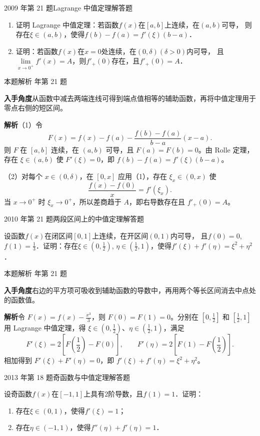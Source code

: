 \documentclass[UTF8,zihao=-4,fontset=fandol]{ctexart}
\renewcommand{\lim}{\operatorname*{lim}\limits}
\newcommand{\QuestionPage}[6]{%
  \par\noindent\begin{minipage}{\linewidth}
  \raggedright
  {\small\textcolor{black!60}{#3\quad #5}\hfill\textcolor{accent}{#2}}\par\smallskip}
\newcommand{\QuestionEnd}{\end{minipage}\par\medskip}
\newcommand{\QuestionPage}[6]{%
  \clearpage
  {\small\textcolor{accent}{#1\hfill #2}}\par\medskip
  {\small\textcolor{black!60}{#3\quad #5\hfill #6}}\par\vspace{9bp}}
\newcommand{\QuestionEnd}{}
\newenvironment{QuestionSolution}[1]{%
  \clearpage
  {\small\textcolor{black!60}{本题解析\quad #1}}\par\medskip
}{\par\clearpage}
\begin{document}
\QuestionPage{2.4 微分中值定理及其应用}{解答题}{2009 年第 21 题}{4}{Lagrange 中值定理}{087 / 234}
\begin{enumerate}
\item 证明 Lagrange 中值定理：若函数$f(x)$在$\left[a,b \right]$上连续，在$(a,b)$可导，
      则存在$\xi \in \left(a,b \right)$，使得$f(b) - f(a) = f'\left(\xi \right)(b - a)$．
\item 证明：若函数$f(x)$在$x = 0$处连续，在$\left(0,\delta \right)\left(\delta > 0 \right)$内可导，
      且$\lim_{x \to 0^+} f'(x) = A$，则$f'_+(0)$存在，且$f'_+(0) = A$．
\end{enumerate}
\QuestionEnd

\begin{QuestionSolution}{2009 年第 21 题}
\textbf{入手角度}\quad 从函数中减去两端连线可得到端点值相等的辅助函数，再将中值定理用于零点右侧的短区间。

\textbf{解析}\quad （1）令
\[
F(x)=f(x)-f(a)-\frac{f(b)-f(a)}{b-a}(x-a).
\]
则 \(F\) 在 \([a,b]\) 连续，在 \((a,b)\) 可导，且 \(F(a)=F(b)=0\)。由 Rolle 定理，存在 \(\xi\in(a,b)\) 使 \(F'(\xi)=0\)，即 \(f(b)-f(a)=f'(\xi)(b-a)\)。

（2）对每个 \(x\in(0,\delta)\)，在 \([0,x]\) 应用（1），存在 \(\xi_x\in(0,x)\) 使
\[
\frac{f(x)-f(0)}x=f'(\xi_x).
\]
当 \(x\to0^+\) 时 \(\xi_x\to0^+\)，所以差商趋于 \(A\)，即右导数存在且 \(f'_+(0)=A\)。
\end{QuestionSolution}

\QuestionPage{2.4 微分中值定理及其应用}{解答题}{2010 年第 21 题}{4}{两段区间上的中值定理}{088 / 234}
设函数$f(x)$在闭区间$[0,1]$上连续，在开区间$(0,1)$内可导，
且$f(0) = 0$, $f(1) = \frac{1}{3}$．证明：存在$\xi \in \left(0,\frac{1}{2}\right)$,
$\eta \in \left(\frac{1}{2},1\right)$，使得$f'(\xi) + f'(\eta) = \xi^2 + \eta^2$．
\QuestionEnd

\begin{QuestionSolution}{2010 年第 21 题}
\textbf{入手角度}\quad 右边的平方项可吸收到辅助函数的导数中，再用两个等长区间消去中点处的函数值。

\textbf{解析}\quad 令 \(F(x)=f(x)-\frac{x^3}{3}\)，则 \(F(0)=F(1)=0\)。分别在 \([0,\frac{1}{2}]\) 和 \([\frac{1}{2},1]\) 用 Lagrange 中值定理，得 \(\xi\in(0,\frac{1}{2})\)、\(\eta\in(\frac{1}{2},1)\)，满足
\[
F'(\xi)=2[F(\frac{1}{2})-F(0)],\qquad
F'(\eta)=2[F(1)-F(\frac{1}{2})].
\]
相加得到 \(F'(\xi)+F'(\eta)=0\)，即 \(f'(\xi)+f'(\eta)=\xi^2+\eta^2\)。
\end{QuestionSolution}

\QuestionPage{2.4 微分中值定理及其应用}{解答题}{2013 年第 18 题}{3}{奇函数与中值定理}{089 / 234}
设奇函数$f(x)$在$[- 1,1]$上具有$2$阶导数，且$f(1) = 1$．证明：
\begin{enumerate}
\item 存在$\xi \in(0,1)$，使得$f'(\xi) = 1$；
\item 存在$\eta \in (-1,1)$，使得$f''(\eta) + f'(\eta) = 1$．
\end{enumerate}
\QuestionEnd
\end{document}
